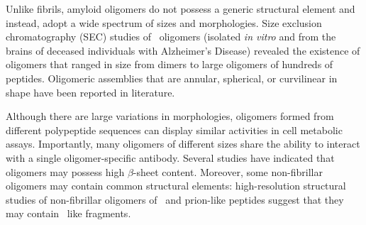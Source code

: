 Unlike fibrils, amyloid oligomers do not possess a generic structural element and instead, adopt a wide spectrum of sizes and morphologies. Size exclusion chromatography (SEC) studies of \ oligomers (isolated \textit{in vitro} and from the brains of deceased individuals with Alzheimer's Disease) revealed the existence of oligomers that ranged in size from dimers to large oligomers of hundreds of peptides.\cite{Haass:2007db,Walsh:2007fu} Oligomeric assemblies that are annular, spherical, or curvilinear in shape have been reported in literature.\cite{Haass:2007db,Kim:2009p2715,Lashuel:2002eg}

Although there are large variations in morphologies, oligomers formed from different polypeptide sequences can display similar activities in cell metabolic assays.\cite{Bucciantini:2002un} Importantly, many oligomers of different sizes share the ability to interact with a single oligomer-specific antibody.\cite{Kayed:2003en,Glabe:2008p130} %
Several studies have indicated that oligomers may possess high $\beta$-sheet content.\cite{Walsh:1999up,Chimon:2007du,Ahmed:2010p5694,Campioni:2010hz} %
Moreover, some non-fibrillar oligomers may contain common structural elements: high-resolution structural studies of non-fibrillar oligomers of \ and prion-like peptides suggest that they may contain \crossb\ like fragments.\cite{Walsh:2010p4761,Stroud:2012dp,Chimon:2007du}
 


